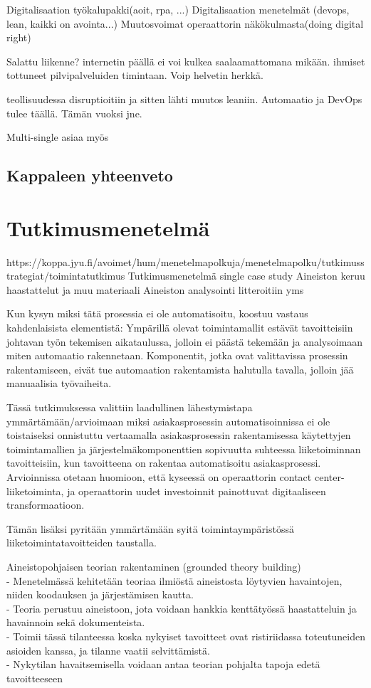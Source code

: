 \documentclass[finnish,12pt,a4paper,pdftex]{article}
\begin{document}
Digitalisaation työkalupakki(aoit, rpa, ...)
Digitalisaation menetelmät (devops, lean, kaikki on avointa...)
Muutosvoimat operaattorin näkökulmasta(doing digital right)


Salattu liikenne? internetin päällä ei voi kulkea saalaamattomana mikään.
ihmiset tottuneet pilvipalveluiden timintaan. Voip helvetin herkkä.


teollisuudessa disruptioitiin ja sitten lähti muutos leaniin.
Automaatio ja DevOps tulee täällä. Tämän vuoksi jne.

Multi-single asiaa myös


\subsection{Kappaleen yhteenveto}

\clearpage

\section{Tutkimusmenetelmä}
https://koppa.jyu.fi/avoimet/hum/menetelmapolkuja/menetelmapolku/tutkimusstrategiat/toimintatutkimus 
Tutkimusmenetelmä single case study
Aineiston keruu haastattelut ja muu materiaali
Aineiston analysointi litteroitiin yms



Kun kysyn miksi tätä prosessia ei ole automatisoitu, koostuu vastaus kahdenlaisista elementistä: Ympärillä olevat toimintamallit estävät tavoitteisiin johtavan työn tekemisen aikataulussa, jolloin ei päästä tekemään ja analysoimaan miten automaatio rakennetaan. Komponentit, jotka ovat valittavissa prosessin rakentamiseen, eivät tue automaation rakentamista halutulla tavalla, jolloin jää manuaalisia työvaiheita.

Tässä tutkimuksessa valittiin laadullinen lähestymistapa ymmärtämään/arvioimaan miksi asiakasprosessin automatisoinnissa ei ole toistaiseksi onnistuttu vertaamalla asiakasprosessin rakentamisessa käytettyjen toimintamallien ja järjestelmäkomponenttien sopivuutta suhteessa liiketoiminnan tavoitteisiin, kun tavoitteena on rakentaa automatisoitu asiakasprosessi. Arvioinnissa otetaan huomioon, että kyseessä on operaattorin contact center-liiketoiminta, ja operaattorin uudet investoinnit painottuvat digitaaliseen transformaatioon. 

Tämän lisäksi pyritään ymmärtämään syitä toimintaympäristössä liiketoimintatavoitteiden taustalla. 

Aineistopohjaisen teorian rakentaminen (grounded theory building)\\
- Menetelmässä kehitetään teoriaa ilmiöstä aineistosta löytyvien havaintojen, niiden koodauksen ja järjestämisen kautta.\\
- Teoria perustuu aineistoon, jota voidaan hankkia kenttätyössä haastatteluin ja havainnoin sekä dokumenteista.\\
- Toimii tässä tilanteessa koska nykyiset tavoitteet ovat ristiriidassa toteutuneiden asioiden kanssa, ja tilanne vaatii selvittämistä.\\
- Nykytilan havaitsemisella voidaan antaa teorian pohjalta tapoja edetä tavoitteeseen\\
\end{document}
